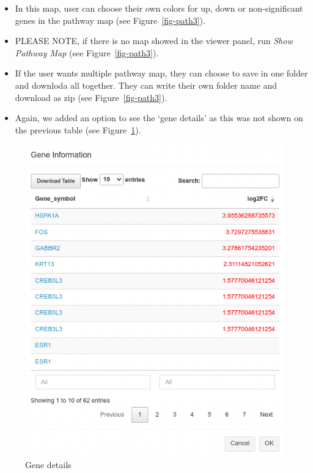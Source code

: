 \documentclass[
  a4paper,
  oneside,
  open=any]{scrreport}
\begin{document}
\begin{itemize}
\item
  In this map, user can choose their own colors for up, down or
  non-significant genes in the pathway map (see Figure~\ref{fig-path3}).
\item
  PLEASE NOTE, if there is no map showed in the viewer panel, run
  \emph{Show Pathway Map} (see Figure~\ref{fig-path3}).
\item
  If the user wants multiple pathway map, they can choose to save in one
  folder and downloda all together. They can write their own folder name
  and download as zip (see Figure~\ref{fig-path3}).
\item
  Again, we added an option to see the `gene details' as this was not
  shown on the previous table (see Figure~\ref{fig-path4}).
\end{itemize}

\begin{figure}[H]

{\centering \includegraphics{./_images/pathway/path4.png}

}

\caption{\label{fig-path4}Gene details}

\end{figure}
\end{document}
